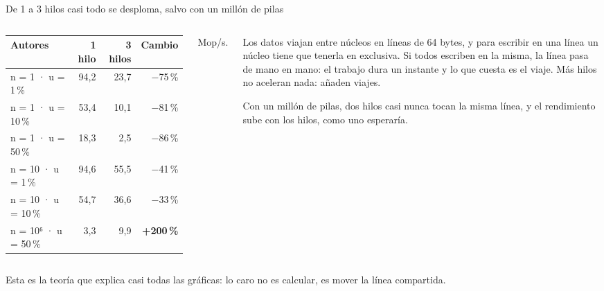 \begin{frame}{De 1 a 3 hilos casi todo se desploma, salvo con un millón de pilas}
  \begin{columns}[T,onlytextwidth]
    \footnotesize
    \begin{tabular}{@{}lrrr@{}}
      \toprule
      \textbf{Autores} & \textbf{1 hilo} & \textbf{3 hilos} & \textbf{Cambio}\\
      \midrule
      n = 1 · u = 1\,\% & 94,2 & 23,7 & −75\,\%\\
      n = 1 · u = 10\,\% & 53,4 & 10,1 & −81\,\%\\
      n = 1 · u = 50\,\% & 18,3 & 2,5 & −86\,\%\\
      n = 10 · u = 1\,\% & 94,6 & 55,5 & −41\,\%\\
      n = 10 · u = 10\,\% & 54,7 & 36,6 & −33\,\%\\
      n = 10⁶ · u = 50\,\% & 3,3 & 9,9 & \textbf{+200\,\%}\\
      \bottomrule
    \end{tabular}\par\vspace{1mm}
    \scriptsize Mop/s.
    \begin{porque}
      Los datos viajan entre núcleos en líneas de 64 bytes, y para escribir en una línea un núcleo tiene que tenerla en exclusiva. Si todos escriben en la misma, la línea pasa de mano en mano: el trabajo dura un instante y lo que cuesta es el viaje. Más hilos no aceleran nada: añaden viajes.\par\vspace{1mm}
      Con un millón de pilas, dos hilos casi nunca tocan la misma línea, y el rendimiento sube con los hilos, como uno esperaría.
    \end{porque}
  \end{columns}
  \vspace{1mm}
  \begin{idea}Esta es la teoría que explica casi todas las gráficas: lo caro no es calcular, es mover la línea compartida.\end{idea}
\end{frame}


